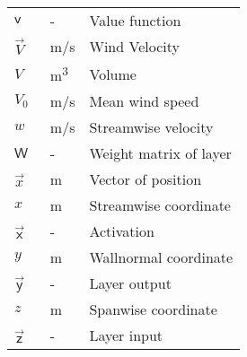 \begin{longtable}{p{5cm}p{4cm}p{5cm}}
    $\mathsf{v}$			& \SI{}{-}		& Value function \\
    $\vec{V}$				& \SI{}{m/s}	& Wind Velocity \\
    $V$						& \SI{}{m^3}	& Volume \\
    $V_0$					& \SI{}{m/s}	& Mean wind speed \\
    $w$                     & \SI{}{m/s}    & Streamwise velocity \\
    $\mathsf{W}$			& \SI{}{-}		& Weight matrix of layer \\
    $\vec{x}$               & \SI{}{m}      & Vector of position \\
    $x$                     & \SI{}{m}      & Streamwise coordinate \\
    $\vec{\mathsf{x}}$		& \SI{}{-}		& Activation \\
    $y$                     & \SI{}{m}      & Wallnormal coordinate \\
    $\vec{\mathsf{y}}$		& \SI{}{-}		& Layer output \\	
    $z$                     & \SI{}{m}      & Spanwise coordinate \\
    $\vec{\mathsf{z}}$		& \SI{}{-}		& Layer input \\
\end{longtable}

